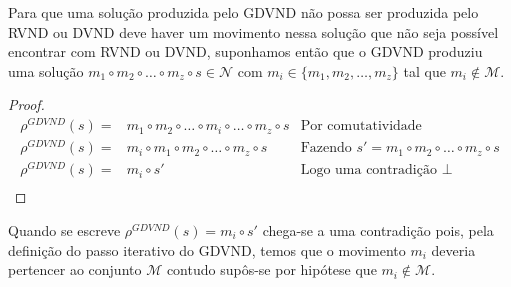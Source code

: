 Para que uma solução produzida pelo GDVND não possa ser produzida pelo RVND ou DVND deve haver um movimento nessa solução que não seja possível encontrar com RVND ou DVND, suponhamos então que o GDVND produziu uma solução $m_1 \circ m_2 \circ \dots \circ m_z \circ s \in \mathcal{N}$ com $m_i \in \{ m_1, m_2, \dots, m_z \}$ tal que $m_i \notin \mathcal{M}$.
\begin{proof}
\begin{align*}
\rho^{GDVND}(s) =& m_1 \circ m_2 \circ \dots \circ m_i \circ \dots \circ m_z \circ s & \textrm{Por comutatividade} \\
\rho^{GDVND}(s) =& m_i \circ m_1 \circ m_2 \circ \dots \circ m_z \circ s & \textrm{Fazendo } s' = m_1 \circ m_2 \circ \dots \circ m_z \circ s \\
\rho^{GDVND}(s) =& m_i \circ s' & \textrm{Logo uma contradição } \bot \\
\end{align*}
\end{proof}
Quando se escreve $\rho^{GDVND}(s) = m_i \circ s'$ chega-se a uma contradição pois, pela definição do passo iterativo do GDVND, temos que o movimento $m_i$ deveria pertencer ao conjunto $\mathcal{M}$ contudo supôs-se por hipótese que $m_i \notin \mathcal{M}$.
